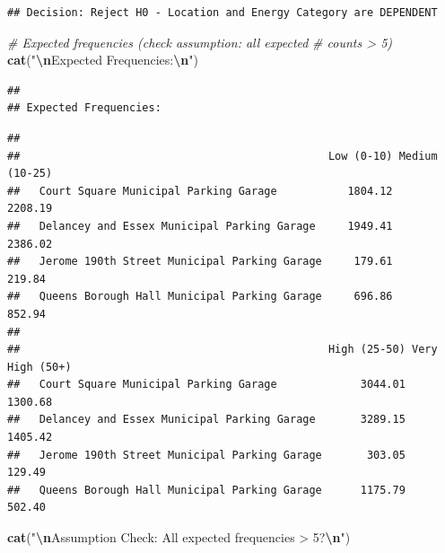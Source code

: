 \documentclass[
  12pt,
]{article}
\newenvironment{Shaded}{\begin{snugshade}}{\end{snugshade}}
\newcommand{\CommentTok}[1]{\textcolor[rgb]{0.56,0.35,0.01}{\textit{#1}}}
\newcommand{\DecValTok}[1]{\textcolor[rgb]{0.00,0.00,0.81}{#1}}
\newcommand{\FunctionTok}[1]{\textcolor[rgb]{0.13,0.29,0.53}{\textbf{#1}}}
\newcommand{\NormalTok}[1]{#1}
\newcommand{\SpecialCharTok}[1]{\textcolor[rgb]{0.81,0.36,0.00}{\textbf{#1}}}
\newcommand{\StringTok}[1]{\textcolor[rgb]{0.31,0.60,0.02}{#1}}
\begin{document}
\begin{verbatim}
## Decision: Reject H0 - Location and Energy Category are DEPENDENT
\end{verbatim}

\begin{Shaded}
\begin{Highlighting}[]
\CommentTok{\# Expected frequencies (check assumption: all expected}
\CommentTok{\# counts \textgreater{} 5)}
\FunctionTok{cat}\NormalTok{(}\StringTok{"}\SpecialCharTok{\textbackslash{}n}\StringTok{Expected Frequencies:}\SpecialCharTok{\textbackslash{}n}\StringTok{"}\NormalTok{)}
\end{Highlighting}
\end{Shaded}

\begin{verbatim}
## 
## Expected Frequencies:
\end{verbatim}

\begin{Shaded}
\end{Shaded}

\begin{verbatim}
##                                               
##                                                Low (0-10) Medium (10-25)
##   Court Square Municipal Parking Garage           1804.12        2208.19
##   Delancey and Essex Municipal Parking Garage     1949.41        2386.02
##   Jerome 190th Street Municipal Parking Garage     179.61         219.84
##   Queens Borough Hall Municipal Parking Garage     696.86         852.94
##                                               
##                                                High (25-50) Very High (50+)
##   Court Square Municipal Parking Garage             3044.01         1300.68
##   Delancey and Essex Municipal Parking Garage       3289.15         1405.42
##   Jerome 190th Street Municipal Parking Garage       303.05          129.49
##   Queens Borough Hall Municipal Parking Garage      1175.79          502.40
\end{verbatim}

\begin{Shaded}
\begin{Highlighting}[]
\FunctionTok{cat}\NormalTok{(}\StringTok{"}\SpecialCharTok{\textbackslash{}n}\StringTok{Assumption Check: All expected frequencies \textgreater{} 5?}\SpecialCharTok{\textbackslash{}n}\StringTok{"}\NormalTok{)}
\end{Highlighting}
\end{Shaded}
\end{document}
